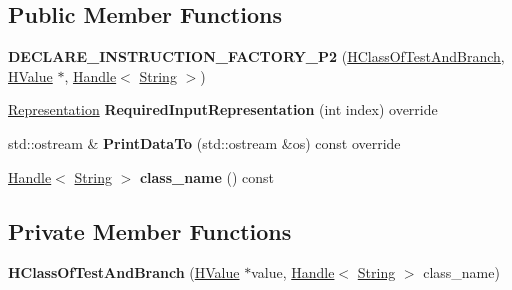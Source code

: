 \subsection*{Public Member Functions}
\begin{DoxyCompactItemize}
\item 
{\bfseries D\+E\+C\+L\+A\+R\+E\+\_\+\+I\+N\+S\+T\+R\+U\+C\+T\+I\+O\+N\+\_\+\+F\+A\+C\+T\+O\+R\+Y\+\_\+\+P2} (\hyperlink{classv8_1_1internal_1_1_h_class_of_test_and_branch}{H\+Class\+Of\+Test\+And\+Branch}, \hyperlink{classv8_1_1internal_1_1_h_value}{H\+Value} $\ast$, \hyperlink{classv8_1_1internal_1_1_handle}{Handle}$<$ \hyperlink{classv8_1_1internal_1_1_string}{String} $>$)\hypertarget{classv8_1_1internal_1_1_h_class_of_test_and_branch_abe7209cdb8eb0930caa61b363b1d1619}{}\label{classv8_1_1internal_1_1_h_class_of_test_and_branch_abe7209cdb8eb0930caa61b363b1d1619}

\item 
\hyperlink{classv8_1_1internal_1_1_representation}{Representation} {\bfseries Required\+Input\+Representation} (int index) override\hypertarget{classv8_1_1internal_1_1_h_class_of_test_and_branch_ab86c1de606103b76ddbe03d01cb18409}{}\label{classv8_1_1internal_1_1_h_class_of_test_and_branch_ab86c1de606103b76ddbe03d01cb18409}

\item 
std\+::ostream \& {\bfseries Print\+Data\+To} (std\+::ostream \&os) const  override\hypertarget{classv8_1_1internal_1_1_h_class_of_test_and_branch_a5a11c0a0a9b1a09bd1f85bcbf902a4b9}{}\label{classv8_1_1internal_1_1_h_class_of_test_and_branch_a5a11c0a0a9b1a09bd1f85bcbf902a4b9}

\item 
\hyperlink{classv8_1_1internal_1_1_handle}{Handle}$<$ \hyperlink{classv8_1_1internal_1_1_string}{String} $>$ {\bfseries class\+\_\+name} () const \hypertarget{classv8_1_1internal_1_1_h_class_of_test_and_branch_af543696c9dfc410284a64701b39c4932}{}\label{classv8_1_1internal_1_1_h_class_of_test_and_branch_af543696c9dfc410284a64701b39c4932}

\end{DoxyCompactItemize}
\subsection*{Private Member Functions}
\begin{DoxyCompactItemize}
\item 
{\bfseries H\+Class\+Of\+Test\+And\+Branch} (\hyperlink{classv8_1_1internal_1_1_h_value}{H\+Value} $\ast$value, \hyperlink{classv8_1_1internal_1_1_handle}{Handle}$<$ \hyperlink{classv8_1_1internal_1_1_string}{String} $>$ class\+\_\+name)\hypertarget{classv8_1_1internal_1_1_h_class_of_test_and_branch_a7bcd4e492e514c06105a4da1937adf3c}{}\label{classv8_1_1internal_1_1_h_class_of_test_and_branch_a7bcd4e492e514c06105a4da1937adf3c}

\end{DoxyCompactItemize}
